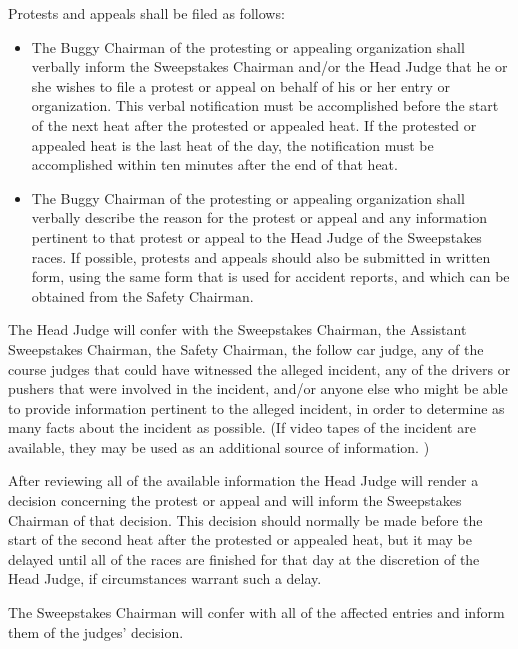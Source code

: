	Protests and appeals shall be filed as follows:

	\begin{itemize}

		\item
		The Buggy Chairman of the protesting or appealing organization shall verbally
		inform the Sweepstakes Chairman and/or the Head Judge that he or she wishes to
		file a protest or appeal on behalf of his or her entry or organization. This
		verbal notification must be accomplished before the start of the next heat
		after the protested or appealed heat. If the protested or appealed heat is the
		last heat of the day, the notification must be accomplished within ten minutes
		after the end of that heat.

		\item
		The Buggy Chairman of the protesting or appealing organization shall verbally
		describe the reason for the protest or appeal and any information pertinent to
		that protest or appeal to the Head Judge of the Sweepstakes races. If possible,
		protests and appeals should also be submitted in written form, using the same
		form that is used for accident reports, and which can be obtained from the
		Safety Chairman.

	\end{itemize}

	The Head Judge will confer with the Sweepstakes Chairman, the Assistant
	Sweepstakes Chairman, the Safety Chairman, the follow car judge, any of the
	course judges that could have witnessed the alleged incident, any of the
	drivers or pushers that were involved in the incident, and/or anyone else who
	might be able to provide information pertinent to the alleged incident, in
	order to determine as many facts about the incident as possible. (If video
	tapes of the incident are available, they may be used as an additional source
	of information. )

	After reviewing all of the available information the Head Judge will render a
	decision concerning the protest or appeal and will inform the Sweepstakes
	Chairman of that decision. This decision should normally be made before the
	start of the second heat after the protested or appealed heat, but it may be
	delayed until all of the races are finished for that day at the discretion of
	the Head Judge, if circumstances warrant such a delay.

	The Sweepstakes Chairman will confer with all of the affected entries and
	inform them of the judges' decision.

